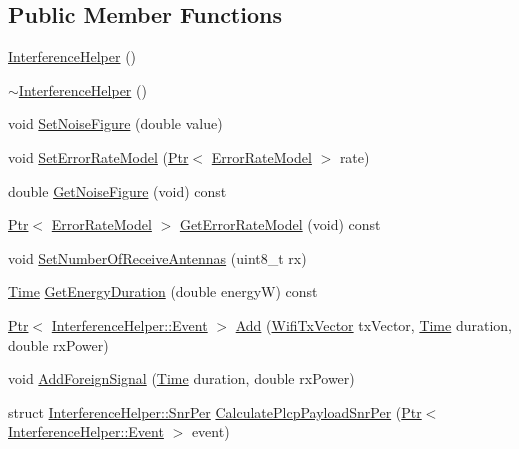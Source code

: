 \subsection*{Public Member Functions}
\begin{DoxyCompactItemize}
\item 
\hyperlink{classns3_1_1InterferenceHelper_a78d8eb395a386b612f5b5501f738d670}{Interference\+Helper} ()
\item 
\hyperlink{classns3_1_1InterferenceHelper_af4651b97b533eb1f1695af971ddb486a}{$\sim$\+Interference\+Helper} ()
\item 
void \hyperlink{classns3_1_1InterferenceHelper_a1af28f6f5d6efc23229e1d25d99c0e9e}{Set\+Noise\+Figure} (double value)
\item 
void \hyperlink{classns3_1_1InterferenceHelper_a4e5bedbeba2a6eb01a86cae2d29e07dc}{Set\+Error\+Rate\+Model} (\hyperlink{classns3_1_1Ptr}{Ptr}$<$ \hyperlink{classns3_1_1ErrorRateModel}{Error\+Rate\+Model} $>$ rate)
\item 
double \hyperlink{classns3_1_1InterferenceHelper_a04b0ac1c53368479a7f2f2c643576e17}{Get\+Noise\+Figure} (void) const 
\item 
\hyperlink{classns3_1_1Ptr}{Ptr}$<$ \hyperlink{classns3_1_1ErrorRateModel}{Error\+Rate\+Model} $>$ \hyperlink{classns3_1_1InterferenceHelper_a80850414d49f70976b8d0e4f47f30542}{Get\+Error\+Rate\+Model} (void) const 
\item 
void \hyperlink{classns3_1_1InterferenceHelper_ae04257f3c9153258970ec7c96abf41ea}{Set\+Number\+Of\+Receive\+Antennas} (uint8\+\_\+t rx)
\item 
\hyperlink{classns3_1_1Time}{Time} \hyperlink{classns3_1_1InterferenceHelper_adc245e264c4db08ce009bf6066b79f13}{Get\+Energy\+Duration} (double energyW) const 
\item 
\hyperlink{classns3_1_1Ptr}{Ptr}$<$ \hyperlink{classns3_1_1InterferenceHelper_1_1Event}{Interference\+Helper\+::\+Event} $>$ \hyperlink{classns3_1_1InterferenceHelper_a6270ccd46290e2c6dfd600d6ad6c39c4}{Add} (\hyperlink{classns3_1_1WifiTxVector}{Wifi\+Tx\+Vector} tx\+Vector, \hyperlink{classns3_1_1Time}{Time} duration, double rx\+Power)
\item 
void \hyperlink{classns3_1_1InterferenceHelper_ae40497433692e4917a86a56e4054efce}{Add\+Foreign\+Signal} (\hyperlink{classns3_1_1Time}{Time} duration, double rx\+Power)
\item 
struct \hyperlink{structns3_1_1InterferenceHelper_1_1SnrPer}{Interference\+Helper\+::\+Snr\+Per} \hyperlink{classns3_1_1InterferenceHelper_adb068fe0e595bab495b68e1dad9aca12}{Calculate\+Plcp\+Payload\+Snr\+Per} (\hyperlink{classns3_1_1Ptr}{Ptr}$<$ \hyperlink{classns3_1_1InterferenceHelper_1_1Event}{Interference\+Helper\+::\+Event} $>$ event)

\end{DoxyCompactItemize}
